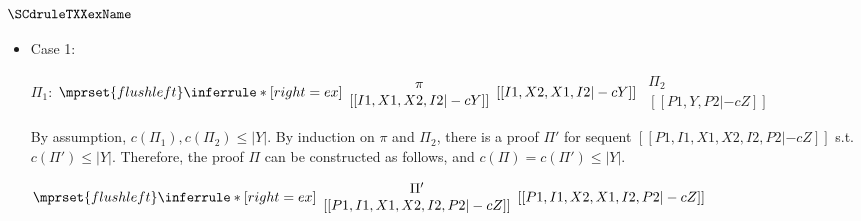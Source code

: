 \subsubsection{$\SCdruleTXXexName$}
\begin{itemize}
\item Case 1:
      \begin{center}
        \scriptsize
        $\Pi_1$:
        \begin{math}
          $$\mprset{flushleft}
          \inferrule* [right={\tiny ex}] {
            {
              \begin{array}{c}
                \pi \\
                {[[I1, X1, X2, I2 |-c Y]]}
              \end{array}
            }
          }{[[I1, X2, X1, I2 |-c Y]]}
        \end{math}
        \qquad\qquad
        \begin{math}
          \begin{array}{c}
            \Pi_2 \\
            {[[P1, Y, P2 |-c Z]]}
          \end{array}
        \end{math}
      \end{center}
      By assumption, $c(\Pi_1),c(\Pi_2)\leq |Y|$. By induction on $\pi$
      and $\Pi_2$, there is a proof $\Pi'$ for sequent
      $[[P1, I1, X1, X2, I2, P2 |-c Z]]$ s.t. $c(\Pi')\leq|Y|$. Therefore,
      the proof $\Pi$ can be constructed as follows, and
      $c(\Pi)=c(\Pi')\leq|Y|$.
      \begin{center}
        \scriptsize
        \begin{math}
          $$\mprset{flushleft}
          \inferrule* [right={\tiny ex}] {
            {
              \begin{array}{c}
                \Pi' \\
                {[[P1, I1, X1, X2, I2, P2 |-c Z]]}
              \end{array}
            }
          }{[[P1, I1, X2, X1, I2, P2 |-c Z]]}
        \end{math}
      \end{center}


\end{itemize}
